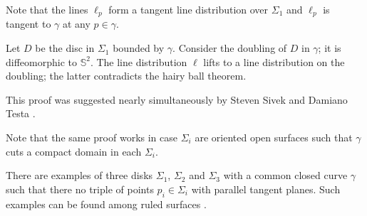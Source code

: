Note that the lines $\ell_p$ form a tangent line distribution over $\Sigma_1$
and $\ell_p$ is tangent to $\gamma$ at any $p\in\gamma$.

Let $D$ be the disc in $\Sigma_1$ bounded by $\gamma$.
Consider the doubling of $D$ in $\gamma$;
it is diffeomorphic to $\mathbb S^2$.
The line distribution $\ell$ lifts to a line distribution on the doubling;
the latter contradicts the hairy ball theorem.\qeds


This proof was suggested nearly simultaneously 
by Steven Sivek 
and Damiano Testa \cite[see][]{two-discs}.

Note that the same proof works in case $\Sigma_i$ are oriented open surfaces such that $\gamma$ cuts a compact domain in each $\Sigma_i$.

There are examples of three disks $\Sigma_1$, $\Sigma_2$ and $\Sigma_3$
with a common closed curve $\gamma$ such that there 
no triple of points $p_i\in\Sigma_i$ with parallel tangent planes.
Such examples can be found among ruled surfaces \cite[see][]{three-discs}.